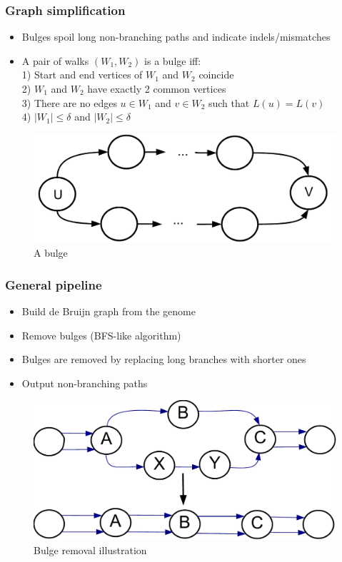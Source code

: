 \documentclass[svgnames,14pt]{beamer}
\begin{document}
\begin{frame}
\frametitle{Graph simplification}
\begin{itemize}
\item Bulges spoil long non-branching paths and indicate indels/mismatches
\item A pair of walks \((W_{1}, W_{2})\) is a bulge iff: \\
1) Start and end vertices of  \(W_{1} \) and  \(W_{2}\) coincide\\
2) \(W_{1} \) and  \(W_{2}\) have exactly 2 common vertices \\
3) There are no edges \(u \in W_{1} \) and \( v \in W_{2}\) such that \(L(u) = L(v) \) \\
4) \(|W_{1}|  \leq \delta \) and \(|W_{2}| \leq \delta \)
\end{itemize}
\begin{changemargin}{-1.cm}{-1.cm}
\begin{figure}
\centering
\includegraphics[scale = 0.30]{Figure2.pdf}
\small \caption{A bulge}
\end{figure}
\end{changemargin}
\end{frame}

\begin{frame}
\frametitle{General pipeline}
\begin{itemize}
\item Build de Bruijn graph from the genome
\item Remove bulges (BFS-like algorithm)
\item Bulges are removed by replacing long branches with shorter ones
\item Output non-branching paths
\end{itemize}
\begin{changemargin}{-1.cm}{-1.cm}
\begin{figure}
\centering
\includegraphics[scale = 0.45]{Figure3.pdf}
\small \caption{Bulge removal illustration}
\end{figure}
\end{changemargin}
\end{frame}
\end{document}
